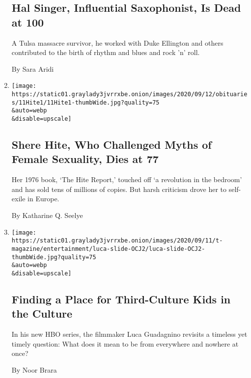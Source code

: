 \begin{enumerate}
  \hypertarget{hal-singer-influential-saxophonist-is-dead-at-100}{%
  \subsection{Hal Singer, Influential Saxophonist, Is Dead at
  100}\label{hal-singer-influential-saxophonist-is-dead-at-100}}

  A Tulsa massacre survivor, he worked with Duke Ellington and others
  contributed to the birth of rhythm and blues and rock 'n' roll.

  By Sara Aridi
\item
  \href{/2020/09/11/books/shere-hite-dead.html}{}

  \texttt{[image: https://static01.graylady3jvrrxbe.onion/images/2020/09/12/obituaries/11Hite1/11Hite1-thumbWide.jpg?quality=75\\\&auto=webp\\\&disable=upscale]}

  \hypertarget{shere-hite-who-challenged-myths-of-female-sexuality-dies-at-77}{%
  \subsection{Shere Hite, Who Challenged Myths of Female Sexuality, Dies
  at
  77}\label{shere-hite-who-challenged-myths-of-female-sexuality-dies-at-77}}

  Her 1976 book, `The Hite Report,' touched off `a revolution in the
  bedroom' and has sold tens of millions of copies. But harsh criticism
  drove her to self-exile in Europe.

  By Katharine Q. Seelye
\item
  \href{/2020/09/11/t-magazine/luca-guadagnino-third-culture-kids.html}{}

  \texttt{[image: https://static01.graylady3jvrrxbe.onion/images/2020/09/11/t-magazine/entertainment/luca-slide-OCJ2/luca-slide-OCJ2-thumbWide.jpg?quality=75\\\&auto=webp\\\&disable=upscale]}

  \hypertarget{finding-a-place-for-third-culture-kids-in-the-culture}{%
  \subsection{Finding a Place for Third-Culture Kids in the
  Culture}\label{finding-a-place-for-third-culture-kids-in-the-culture}}

  In his new HBO series, the filmmaker Luca Guadagnino revisits a
  timeless yet timely question: What does it mean to be from everywhere
  and nowhere at once?

  By Noor Brara
\end{enumerate}


